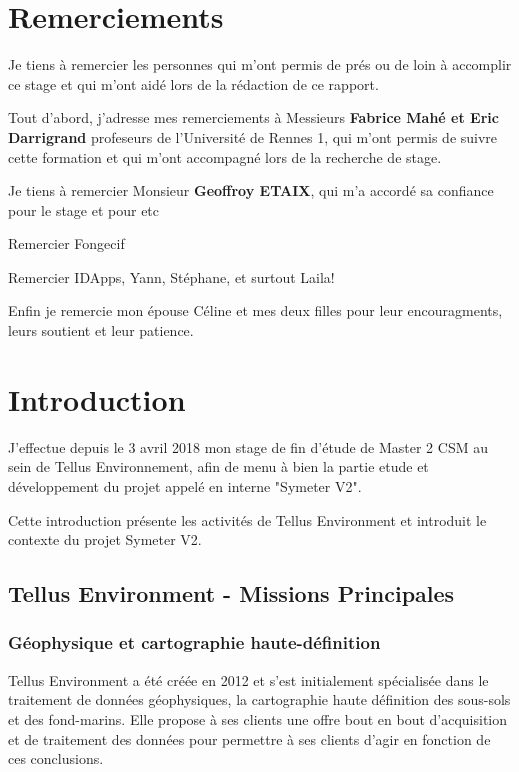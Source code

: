 \documentclass[12pt,a4paper]{report}
\begin{document}
\chapter*{Remerciements}%
\thispagestyle{empty}%


Je tiens à remercier les personnes qui m'ont permis de prés ou de loin à accomplir ce stage et qui m'ont aidé lors de la rédaction de ce rapport.

\para Tout d'abord, j'adresse mes remerciements à Messieurs \textbf{Fabrice Mahé et Eric Darrigrand} profeseurs de l'Université de Rennes 1, qui m'ont permis de suivre cette formation et qui m'ont accompagné lors de la recherche de stage.

\para Je tiens à remercier Monsieur \textbf{Geoffroy ETAIX}, qui m'a accordé sa confiance pour le stage et pour etc 

\para Remercier Fongecif

\para Remercier IDApps, Yann, Stéphane, et surtout Laila!

\para Enfin je remercie mon épouse Céline et mes deux filles pour leur encouragments, leurs soutient et leur patience.




\setcounter{tocdepth}{5}
\tableofcontents
\newpage

\chapter{Introduction}

J'effectue depuis le 3 avril 2018 mon stage de fin d'étude de Master 2 CSM au sein de Tellus Environnement, afin de menu à bien la partie etude et développement du projet appelé en interne "Symeter V2".

\para Cette introduction présente les activités de Tellus Environment et introduit le contexte du projet Symeter V2.

	\section{Tellus Environment - Missions Principales}

	\subsection{Géophysique et cartographie haute-définition}
	Tellus Environment a été créée en 2012 et s'est initialement spécialisée dans le traitement de données géophysiques, la cartographie haute définition des sous-sols et des fond-marins. Elle propose à ses clients une offre bout en bout d'acquisition et de traitement des données pour permettre à ses clients d'agir en fonction de ces conclusions.
	
\end{document}
